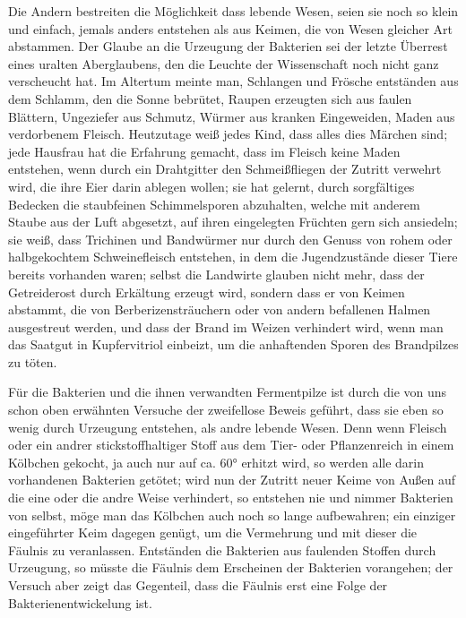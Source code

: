 \documentclass[a4paper, 11pt, oneside, english]{article}
\begin{document}
Die Andern bestreiten die Möglichkeit dass lebende Wesen, seien sie noch so klein und einfach, jemals anders entstehen als aus Keimen, die von Wesen gleicher Art abstammen. Der Glaube an die Urzeugung der Bakterien sei der letzte Überrest eines uralten Aberglaubens, den die Leuchte der Wissenschaft noch nicht ganz verscheucht hat. Im Altertum meinte man, Schlangen und Frösche entständen aus dem Schlamm, den die Sonne bebrütet, Raupen erzeugten sich aus faulen Blättern, Ungeziefer aus Schmutz, Würmer aus kranken Eingeweiden, Maden aus verdorbenem Fleisch. Heutzutage weiß jedes Kind, dass alles dies Märchen sind; jede Hausfrau hat die Erfahrung gemacht, dass im Fleisch keine Maden entstehen, wenn durch ein Drahtgitter den Schmeißfliegen der Zutritt verwehrt wird, die ihre Eier darin ablegen wollen; sie hat gelernt, durch sorgfältiges Bedecken die staubfeinen Schimmelsporen abzuhalten, welche mit anderem Staube aus der Luft abgesetzt, auf ihren eingelegten Früchten gern sich ansiedeln; sie weiß, dass Trichinen und Bandwürmer nur durch den Genuss von rohem oder halbgekochtem Schweinefleisch entstehen, in dem die Jugendzustände dieser Tiere bereits vorhanden waren; selbst die Landwirte glauben nicht mehr, dass der Getreiderost durch Erkältung erzeugt wird, sondern dass er von Keimen abstammt, die von Berberizensträuchern oder von andern befallenen Halmen ausgestreut werden, und dass der Brand im Weizen verhindert wird, wenn man das Saatgut in Kupfervitriol einbeizt, um die anhaftenden Sporen des Brandpilzes zu töten.

Für die Bakterien und die ihnen verwandten Fermentpilze ist durch die von uns schon oben erwähnten Versuche der zweifellose Beweis geführt, dass sie eben so wenig durch Urzeugung entstehen, als andre lebende Wesen. Denn wenn Fleisch oder ein andrer stickstoffhaltiger Stoff aus dem Tier- oder Pflanzenreich in einem Kölbchen gekocht, ja auch nur auf ca. 60° erhitzt wird, so werden alle darin vorhandenen Bakterien getötet; wird nun der Zutritt neuer Keime von Außen auf die eine oder die andre Weise verhindert, so entstehen nie und nimmer Bakterien von selbst, möge man das Kölbchen auch noch so lange aufbewahren; ein einziger eingeführter Keim dagegen genügt, um die Vermehrung und mit dieser die Fäulnis zu veranlassen. Entständen die Bakterien aus faulenden Stoffen durch Urzeugung, so müsste die Fäulnis dem Erscheinen der Bakterien vorangehen; der Versuch aber zeigt das Gegenteil, dass die Fäulnis erst eine Folge der Bakterienentwickelung ist.
\end{document}
